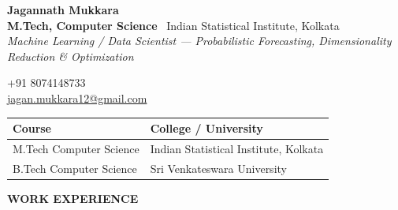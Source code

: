 \documentclass[10pt,article]{article}
\newcommand{\resheading}[1]{%
 \vspace{7pt}%
 \noindent\colorbox{mygrey}{\parbox{\dimexpr\textwidth-2\fboxsep\relax}{\textbf{\small #1}}}%
 \vspace{4pt}%
}
\begin{document}
\noindent
\begin{minipage}[b]{0.68\textwidth}
   {\Large \textbf{Jagannath Mukkara}}\\[2pt]
   \textbf{M.Tech, Computer Science} \textbar\ Indian Statistical Institute, Kolkata \\[1pt]
   \small \textit{Machine Learning / Data Scientist --- Probabilistic Forecasting, Dimensionality Reduction \& Optimization}
\end{minipage}%
\hfill
\begin{minipage}[b]{0.32\textwidth}
   \raggedleft \small
   +91 8074148733 \\
   \href{mailto:jagan.mukkara12@gmail.com}{jagan.mukkara12@gmail.com}
\end{minipage}
\vspace{6pt}
\noindent
\begin{tabularx}{\textwidth}{@{} l X @{}}
\toprule
\textbf{Course} & \textbf{College / University} \\
\midrule
M.Tech Computer Science & Indian Statistical Institute, Kolkata \\
B.Tech Computer Science & Sri Venkateswara University \\
\bottomrule
\end{tabularx}
\resheading{WORK EXPERIENCE}
\end{document}
